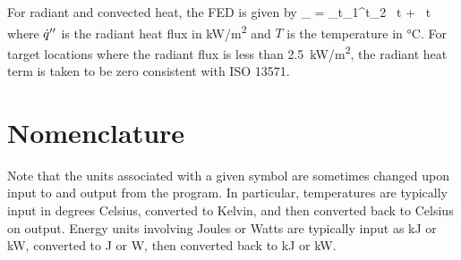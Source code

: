 \documentclass[12pt,twoside]{book}
\begin{document}
For radiant and convected heat, the FED is given by
\be
    \chi_{\FED} = \sum\limits_{t_1}^{t_2}  \, \Delta t +  \, \Delta t
\ee
where $\dot{q}''$ is the radiant heat flux in \unit{kW/m^2} and $T$ is the temperature in \unit{\degreeCelsius}. For target locations where the radiant flux is less than 2.5~\unit{kW/m^2}, the radiant heat term is taken to be zero consistent with ISO 13571.

\printbibliography[heading=bibintoc,title={References}]

\appendix
{}

%
%

\chapter{Nomenclature}
\label{nomenclature}

Note that the units associated with a given symbol are sometimes changed upon input to and output from the program. In particular, temperatures are typically input in degrees Celsius, converted to Kelvin, and then converted back to Celsius on output. Energy units involving Joules or Watts are typically input as kJ or kW, converted to J or W, then converted back to kJ or kW.
\end{document}
